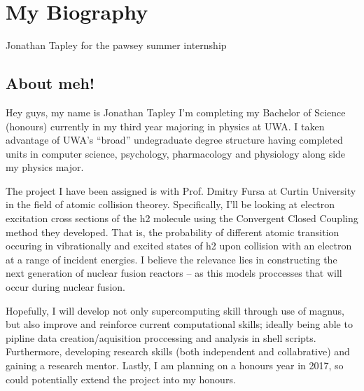 \section{My Biography}
Jonathan Tapley for the pawsey summer internship
\subsection{About meh!}
Hey guys, my name is Jonathan Tapley I’m completing my Bachelor of Science (honours) currently  in my third year majoring in physics at UWA. I taken advantage of UWA’s “broad” undegraduate degree structure having completed units in computer science, psychology, pharmacology and physiology along side my physics major.

The project I have been assigned is with Prof. Dmitry Fursa at Curtin University in the field of atomic collision theorey. Specifically, I’ll be looking at electron excitation cross sections of the h2 molecule using the Convergent Closed Coupling method they developed. That is, the probability of different atomic transition occuring in vibrationally and excited states of h2 upon collision with an electron at a range of incident energies. I believe the relevance lies in constructing the next generation of nuclear fusion reactors – as this models proccesses that will occur during nuclear fusion.

Hopefully, I will develop not only supercomputing skill through use of magnus, but also improve and reinforce current computational skills; ideally being able to pipline data creation/aquisition proccessing and analysis in shell scripts. Furthermore, developing research skills (both independent and collabrative) and gaining a research mentor. Lastly, I am planning on a honours year in 2017, so could potentially extend the project into my honours.